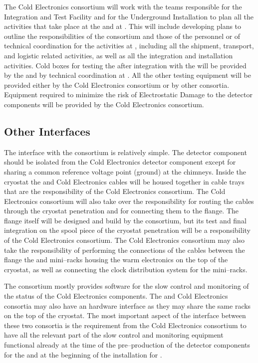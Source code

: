 The Cold Electronics consortium will work with the teams responsible
for the Integration and Test Facility and for the Underground Installation
to plan all the activities that take place at the  and at
\surf. This will include developing plans to outline the responsibilities
of the consortium and those of the  personnel or of 
technical coordination for the activities at \surf, including all the
shipment, transport, and logistic related activities, as well as all
the integration and installation activities. Cold boxes for testing
the  after integration with the  will be 
provided by the  and by technical coordination at \surf.
All the other testing equipment will be provided either by the Cold
Electronics consortium or by other consortia. Equipment required to
minimize the risk of Electrostatic Damage to the detector components
will  be provided by the Cold Electronics consortium. 

\subsection{Other Interfaces}
\label{sec:fdsp-tpcelec-interfaces-other}

The interface with the  consortium is relatively simple.
The  detector component should be isolated from the Cold
Electronics detector component except for sharing a common reference 
voltage point (ground) at the chimneys. Inside the cryostat the 
 and Cold Electronics cables will be housed together in
cable trays that are the responsibility of the Cold  Electronics
consortium. The Cold  Electronics consortium will also take over
the responsibility for routing the  cables through the
cryostat penetration and for connecting them to the 
flange. The flange itself will be designed and build by the 
consortium, but its test and final integration on the spool piece
of the cryostat penetration will be a responsibility of the Cold
Electronics consortium. The Cold Electronics consortium may also
take the responsibility of performing the connections of the 
 cables between the flange the and mini--racks housing
the  warm electronics on the top of the cryostat, as
well as connecting the clock distribution system for the mini--racks.

The  consortium mostly provides software for the slow
control and monitoring of the status of the Cold Electronics components.
The  and Cold Electronics consortia may also have an
hardware interface as they may share the same racks on the top of the
cryostat. The most important aspect of the interface between these
two consortia is the requirement from the Cold Electronics consortium
to have all the relevant part of the slow control and monitoring
equipment functional already at the time of the pre--production of
the detector components for the  and at the beginning
of the installation for \surf.
